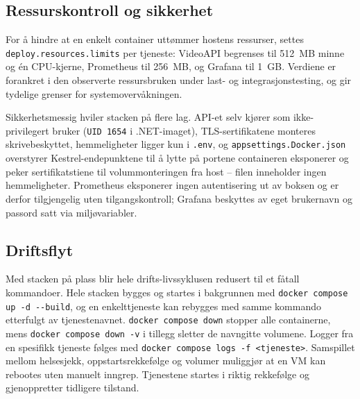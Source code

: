 \subsection{Ressurskontroll og sikkerhet}
\label{subsec:docker-security}

For å hindre at en enkelt container uttømmer hostens ressurser, settes \texttt{deploy.resources.limits} per tjeneste: VideoAPI begrenses til 512~MB minne og én CPU-kjerne, Prometheus til 256~MB, og Grafana til 1~GB. Verdiene er forankret i den observerte ressursbruken under last- og integrasjonstesting, og gir tydelige grenser for systemovervåkningen.

Sikkerhetsmessig hviler stacken på flere lag. API-et selv kjører som ikke-privilegert bruker (\texttt{UID 1654} i .NET-imaget), TLS-sertifikatene monteres skrivebeskyttet, hemmeligheter ligger kun i \texttt{.env}, og \texttt{appsettings.Docker.json} overstyrer Kestrel-endepunktene til å lytte på portene containeren eksponerer og peker sertifikatstiene til volummonteringen fra host -- filen inneholder ingen hemmeligheter. Prometheus eksponerer ingen autentisering ut av boksen og er derfor tilgjengelig uten tilgangskontroll; Grafana beskyttes av eget brukernavn og passord satt via miljøvariabler.

\subsection{Driftsflyt}
\label{subsec:docker-ops}

Med stacken på plass blir hele drifts-livssyklusen redusert til et fåtall kommandoer. Hele stacken bygges og startes i bakgrunnen med \texttt{docker compose up -d -{}-build}, og en enkelttjeneste kan rebygges med samme kommando etterfulgt av tjenestenavnet. \texttt{docker compose down} stopper alle containerne, mens \texttt{docker compose down -v} i tillegg sletter de navngitte volumene. Logger fra en spesifikk tjeneste følges med \texttt{docker compose logs -f <tjeneste>}. Samspillet mellom helsesjekk, oppstartsrekkefølge og volumer muliggjør at en VM kan rebootes uten manuelt inngrep. Tjenestene startes i riktig rekkefølge og gjenoppretter tidligere tilstand.